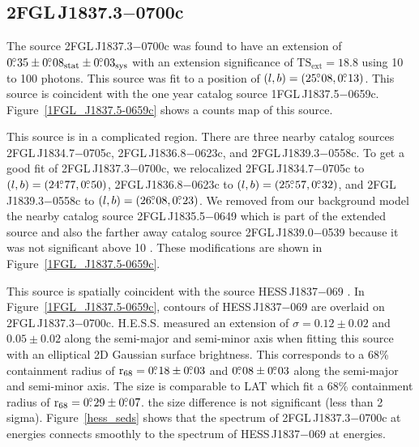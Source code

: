 \documentclass[12pt,preprint]{aastex}
\newcommand{\gev}{\text{GeV}\xspace}
\newcommand{\tev}{\text{TeV}\xspace}
\newcommand{\tsext}{{\ensuremath{\text{TS}_{\text{ext}}}}\xspace}
\newcommand{\rsixeight}{{\ensuremath{\text{r}_{68}}}\xspace}
\newcommand{\sys}{\text{sys}\xspace}
\newcommand{\stat}{\text{stat}\xspace}
\begin{document}
\subsection{2FGL\,J1837.3$-$0700c}
\label{section_2FGL_J1837.3-0700c}




The source 2FGL\,J1837.3$-$0700c was found 
to
have an extension of $0\fdg35\pm0\fdg08_\stat\pm0\fdg03_\sys$ with an
extension significance of $\tsext=18.8$
using 10 \gev to 100 \gev photons.  This source was fit to a position
of $(l,b)=(25\mbox{$.\!\!^\circ$}08,0\mbox{$.\!\!^\circ$}13)$.  This source is coincident with the one
year catalog source 1FGL\,J1837.5$-$0659c.  Figure~\ref{1FGL_J1837.5-0659c}
shows a counts map of this source.

This source is in a complicated region. There are three nearby
catalog sources 2FGL\,J1834.7$-$0705c, 2FGL\,J1836.8$-$0623c, and
2FGL\,J1839.3$-$0558c.  To get a good fit of 2FGL\,J1837.3$-$0700c, we
relocalized 2FGL\,J1834.7$-$0705c to $(l,b)=(24\mbox{$.\!\!^\circ$}77,0\mbox{$.\!\!^\circ$}50)$,
2FGL\,J1836.8$-$0623c to $(l,b)=(25\mbox{$.\!\!^\circ$}57,0\mbox{$.\!\!^\circ$}32)$, and
2FGL\,J1839.3$-$0558c to $(l,b)=(26\mbox{$.\!\!^\circ$}08,0\mbox{$.\!\!^\circ$}23)$.  We removed from
our background model the
nearby catalog source 2FGL\,J1835.5$-$0649 which is part of the extended
source and also the farther away catalog source 2FGL\,J1839.0$-$0539
because it was not significant above 10 \gev. These modifications are
shown in Figure~\ref{1FGL_J1837.5-0659c}.  

This source is spatially coincident with the \tev source HESS\,J1837$-$069
\citep{hess_plane_survey}.  In Figure~\ref{1FGL_J1837.5-0659c}, contours
of HESS\,J1837$-$069 are overlaid on 2FGL\,J1837.3$-$0700c. H.E.S.S. measured
an extension of $\sigma=0.12\pm0.02$ and $0.05\pm0.02$
along the semi-major and semi-minor axis when fitting this source
with an elliptical 2D Gaussian surface brightness.  This corresponds
to a 68\% containment radius of $\rsixeight=0\fdg18\pm0\fdg03$ and
$0\mbox{$.\!\!^\circ$}08\pm0\mbox{$.\!\!^\circ$}03$ along the semi-major and semi-minor axis. The
size is comparable to LAT which fit a 68\% containment radius of
$\rsixeight=0\fdg29\pm0\fdg07$.  the size difference is not significant
(less than 2 sigma).  Figure~\ref{hess_seds} shows that the spectrum
of 2FGL\,J1837.3$-$0700c at \gev energies
connects smoothly to the spectrum of HESS\,J1837$-$069
at \tev energies.
\end{document}
